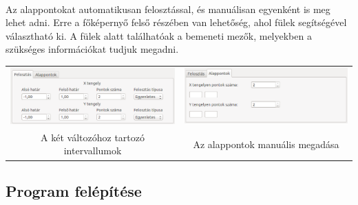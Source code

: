 \documentclass[12pt]{report}
\begin{document}
\paragraph{}
Az alappontokat automatikusan felosztással, és manuálisan egyenként is meg lehet adni. Erre a főképernyő felső részében van lehetőség, ahol fülek segítségével választható ki. A fülek alatt találhatóak a bemeneti mezők, melyekben a szükséges információkat tudjuk megadni. \\
\begin{tabular}{cc}
\includegraphics[width=7cm]{pics/gui/partition1} & \includegraphics[width=7cm]{pics/gui/partition2} \\
{\footnotesize A két változóhoz tartozó intervallumok} & {\footnotesize Az alappontok manuális megadása} 
\end{tabular}

\subsection{Program felépítése}
\end{document}
